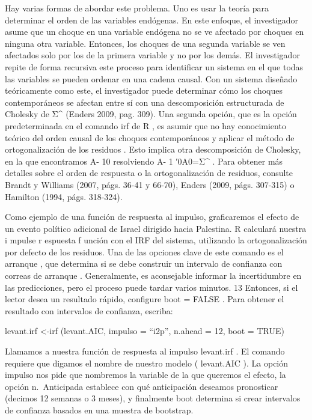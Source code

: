 \documentclass[
]{book}
\begin{document}
Hay varias formas de abordar este problema. Uno es usar la teoría para determinar el orden de las variables endógenas. En este enfoque, el investigador asume que un choque en una variable endógena no se ve afectado por choques en ninguna otra variable. Entonces, los choques de una segunda variable se ven afectados solo por los de la primera variable y no por los demás. El investigador repite de forma recursiva este proceso para identificar un sistema en el que todas las variables se pueden ordenar en una cadena causal. Con un sistema diseñado teóricamente como este, el investigador puede determinar cómo los choques contemporáneos se afectan entre sí con una descomposición estructurada de Cholesky de Σ\^{} (Enders 2009, pag. 309). Una segunda opción, que es la opción predeterminada en el comando irf de R , es asumir que no hay conocimiento teórico del orden causal de los choques contemporáneos y aplicar el método de ortogonalización de los residuos . Esto implica otra descomposición de Cholesky, en la que encontramos A- 10 resolviendo A- 1 ′0A0=Σ\^{} . Para obtener más detalles sobre el orden de respuesta o la ortogonalización de residuos, consulte Brandt y Williams (2007, págs. 36-41 y 66-70), Enders (2009, págs. 307-315) o Hamilton (1994, págs. 318-324).

Como ejemplo de una función de respuesta al impulso, graficaremos el efecto de un evento político adicional de Israel dirigido hacia Palestina. R calculará nuestra i mpulse r espuesta f unción con el IRF del sistema, utilizando la ortogonalización por defecto de los residuos. Una de las opciones clave de este comando es el arranque , que determina si se debe construir un intervalo de confianza con correas de arranque . Generalmente, es aconsejable informar la incertidumbre en las predicciones, pero el proceso puede tardar varios minutos. 13 Entonces, si el lector desea un resultado rápido, configure boot = FALSE . Para obtener el resultado con intervalos de confianza, escriba:

levant.irf \textless-irf (levant.AIC, impulso = ``i2p'', n.ahead = 12, boot = TRUE)

Llamamos a nuestra función de respuesta al impulso levant.irf . El comando requiere que digamos el nombre de nuestro modelo ( levant.AIC ). La opción impulso nos pide que nombremos la variable de la que queremos el efecto, la opción n.~Anticipada establece con qué anticipación deseamos pronosticar (decimos 12 semanas o 3 meses), y finalmente boot determina si crear intervalos de confianza basados \hspace{0pt}\hspace{0pt}en una muestra de bootstrap.
\end{document}
